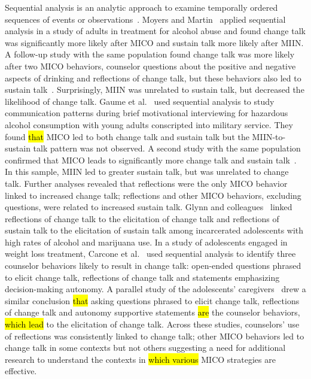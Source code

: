\documentclass[smallextended]{svjour3}       %
\begin{document}
Sequential analysis is an analytic approach to examine temporally ordered sequences of events or observations~\cite{bakeman1997observing, bakeman2011sequential}. Moyers and Martin~\cite{moyers2006therapist} applied sequential analysis in a study of adults in treatment for alcohol abuse and found change talk was significantly more likely after MICO and sustain talk more likely after MIIN. A follow-up study with the same population found change talk was more likely after two MICO behaviors, counselor questions about the positive and negative aspects of drinking and reflections of change talk, but these behaviors also led to sustain talk~\cite{moyers2009session}. Surprisingly, MIIN was unrelated to sustain talk, but decreased the likelihood of change talk. Gaume et al.~\cite{gaume2008counsellor} used sequential analysis to study communication patterns during brief motivational interviewing for hazardous alcohol consumption with young adults conscripted into military service. They found \hl{that} MICO led to both change talk and sustain talk but the MIIN-to-sustain talk pattern was not observed. A second study with the same population confirmed that MICO leads to significantly more change talk and sustain talk~\cite{gaume2010counselor}. In this sample, MIIN led to greater sustain talk, but was unrelated to change talk. Further analyses revealed that reflections were the only MICO behavior linked to increased change talk; reflections and other MICO behaviors, excluding questions, were related to increased sustain talk. Glynn and colleagues~\cite{glynn2014change} linked reflections of change talk to the elicitation of change talk and reflections of sustain talk to the elicitation of sustain talk among incarcerated adolescents with high rates of alcohol and marijuana use. In a study of adolescents engaged in weight loss treatment, Carcone et al.~\cite{carcone2013provider} used sequential analysis to identify three counselor behaviors likely to result in change talk: open-ended questions phrased to elicit change talk, reflections of change talk and statements emphasizing decision-making autonomy. A parallel study of the adolescents' caregivers~\cite{jacques2016building} drew a similar conclusion \hl{that} asking questions phrased to elicit change talk, reflections of change talk and autonomy supportive statements \hl{are} the counselor behaviors, \hl{which lead} to the elicitation of change talk. Across these studies, counselors' use of reflections was consistently linked to change talk; other MICO behaviors led to change talk in some contexts but not others suggesting a need for additional research to understand the contexts in \hl{which various} MICO strategies are effective. 
\end{document}
